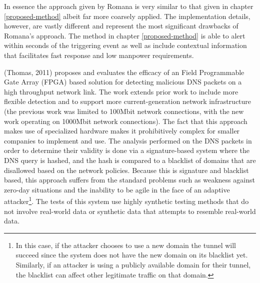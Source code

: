 \documentclass[12pt]{report}
\theoremstyle{remark}
\theoremstyle{definition}
\theoremstyle{definition}
\theoremstyle{definition}
\begin{document}
In essence the approach given by Romana is very similar to that given in chapter
\ref{proposed-method} albeit far more coarsely applied. The implementation
details, however, are vastly different and represent the most significant
drawbacks of Romana's approach. The method in chapter \ref{proposed-method} is
able to alert within seconds of the triggering event as well as include
contextual information that facilitates fast response and low manpower requirements.

(Thomas, 2011)\cite{Thomas2011} proposes and evaluates the efficacy of an Field 
Programmable Gate Array (FPGA) based solution for detecting malicious DNS
packets on a high throughput network link. The work extends prior work to
include more flexible detection and to support more current-generation network
infrastructure (the previous work was limited to 100Mbit network connections,
with the new work operating on 1000Mbit network connections). The fact that this
approach makes use of specialized hardware makes it prohibitively complex for
smaller companies to implement and use. The analysis performed on the DNS
packets in order to determine their validity is done via a signature-based
system where the DNS query is hashed, and the hash is compared to a blacklist of
domains that are disallowed based on the network policies. Because this is
signature and blacklist based, this approach suffers from the standard problems
such as weakness against zero-day situations and the inability to be agile in
the face of an adaptive attacker\footnote{In this case, if the attacker chooses
to use a new domain the tunnel will succeed since the system does not have the
new domain on its blacklist yet. Similarly, if an attacker is using a publicly
available domain for their tunnel, the blacklist can affect other legitimate
traffic on that domain.}. The tests of this system use highly synthetic testing
methods that do not involve real-world data or synthetic data that attempts to
resemble real-world data.
\end{document}
